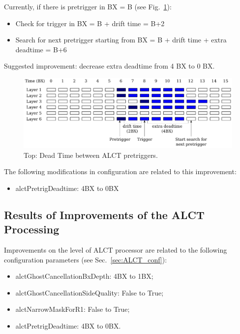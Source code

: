 Currently, if there is pretrigger in BX = B (see Fig.~\ref{fig:alct_deadtime}):
\begin{itemize}
    \item Check for trigger in BX = B + drift time = B+2
    \item Search for next pretrigger starting from BX = B + drift time + extra deadtime = B+6
\end{itemize}

Suggested improvement: decrease extra deadtime from 4 BX to 0 BX.

\begin{figure}[tbh]
        \begin{center}
                \includegraphics[width=0.98\linewidth]{figures/stretched_hits_alct_deadtime.pdf}
                \caption{Top: Dead Time between ALCT pretriggers.}
                \label{fig:alct_deadtime}
        \end{center}
\end{figure}

The following modifications in configuration are related to this improvement:
\begin{itemize}
    \item alctPretrigDeadtime: 4BX to 0BX
\end{itemize}


\subsection{Results of Improvements of the ALCT Processing}

Improvements on the level of ALCT processor are related to the following configuration parameters (see Sec.~\ref{sec:ALCT_conf}):
\begin{itemize}
	\item alctGhostCancellationBxDepth: 4BX to 1BX;
	\item alctGhostCancellationSideQuality: False to True;
	\item alctNarrowMaskForR1: False to True;
	\item alctPretrigDeadtime: 4BX to 0BX.
\end{itemize}

